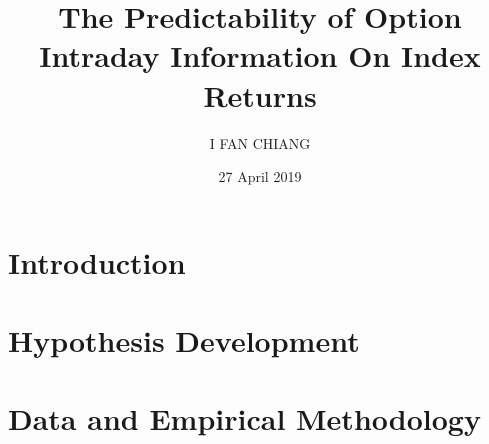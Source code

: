 \documentclass[oneside,12pt]{article}
\title{\textbf{The Predictability of Option Intraday Information On Index Returns}}
\author{I FAN CHIANG}
\date{27 April 2019}
\begin{document}
\maketitle

\begin{abstract}
\centering

\end{abstract}


\fontsize{13pt}{18pt}\selectfont
\section{Introduction}\label{ch:Introduction}



\fontsize{13pt}{18pt}\selectfont
\section{Hypothesis Development}


\fontsize{13pt}{18pt}\selectfont
\section{Data and Empirical Methodology}




\newpage
\printbibliography
\end{document}

